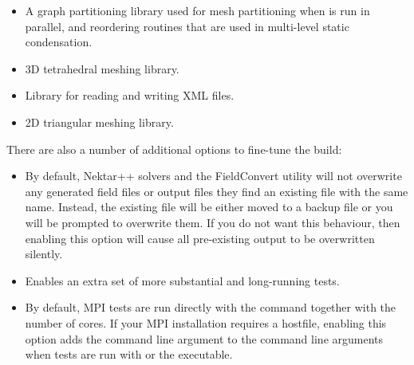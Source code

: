 \begin{itemize}
    \item {}

    A graph partitioning library used for mesh partitioning when \nekpp is run
    in parallel, and reordering routines that are used in multi-level static
    condensation.

    \item {}
    
    3D tetrahedral meshing library.
    
    \item {}

    Library for reading and writing XML files.
    
    \item {}
    
    2D triangular meshing library.
\end{itemize}

There are also a number of additional options to fine-tune the build:
\begin{itemize}
    \item {}

    By default, Nektar++ solvers and the FieldConvert utility will not overwrite
    any generated field files or output files they find an existing file with
    the same name. Instead, the existing file will be either moved to a backup
    file or you will be prompted to overwrite them. If you do not want this
    behaviour, then enabling this option will cause all pre-existing output to
    be overwritten silently.

    \item {}
    
    Enables an extra set of more substantial and long-running tests.
    
    \item {}
    
    By default, MPI tests are run directly with the  command
    together with the number of cores. If your MPI installation requires a
    hostfile, enabling this option adds the command line argument
     to the command line arguments when tests are run
    with  or the  executable.
\end{itemize}
